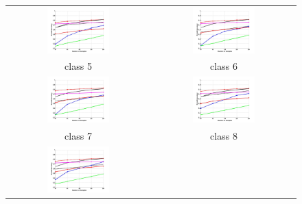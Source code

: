\begin{figure}[h]
	\centering
	\begin{tabular}{cc}
		\includegraphics[width=0.45\textwidth]{appendix/tables/MNIST_Rate_5_class_5.jpg} & 
		\includegraphics[width=0.45\textwidth]{appendix/tables/MNIST_Rate_5_class_6.jpg} \\
		class 5 & class 6\\
		\includegraphics[width=0.45\textwidth]{appendix/tables/MNIST_Rate_5_class_7.jpg} & 
		\includegraphics[width=0.45\textwidth]{appendix/tables/MNIST_Rate_5_class_8.jpg} \\
		class 7 & class 8\\
		\includegraphics[width=0.45\textwidth]{appendix/tables/MNIST_Rate_5_class_9.jpg} & 

\end{tabular}
\end{figure}
